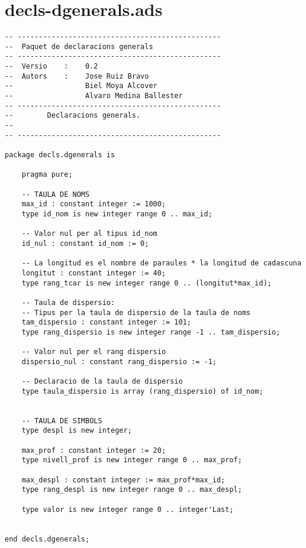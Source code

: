 \documentclass[10pt]{report}
\begin{document}
    \section{decls-dgenerals.ads}
    \begin{lstlisting}[style=Ada]
-- ------------------------------------------------
--  Paquet de declaracions generals
-- ------------------------------------------------
--  Versio    :    0.2
--  Autors    :    Jose Ruiz Bravo
--                 Biel Moya Alcover
--                 Alvaro Medina Ballester
-- ------------------------------------------------
--        Declaracions generals.
--
-- ------------------------------------------------

package decls.dgenerals is

    pragma pure;

    -- TAULA DE NOMS
    max_id : constant integer := 1000;
    type id_nom is new integer range 0 .. max_id;
    
    -- Valor nul per al tipus id_nom
    id_nul : constant id_nom := 0;
        
    -- La longitud es el nombre de paraules * la longitud de cadascuna
    longitut : constant integer := 40;
    type rang_tcar is new integer range 0 .. (longitut*max_id);
    
    -- Taula de dispersio:
    -- Tipus per la taula de dispersio de la taula de noms
    tam_dispersio : constant integer := 101;
    type rang_dispersio is new integer range -1 .. tam_dispersio;
    
    -- Valor nul per el rang dispersio
    dispersio_nul : constant rang_dispersio := -1;
    
    -- Declaracio de la taula de dispersio
    type taula_dispersio is array (rang_dispersio) of id_nom;
    
    
    -- TAULA DE SIMBOLS
    type despl is new integer;
    
    max_prof : constant integer := 20;
    type nivell_prof is new integer range 0 .. max_prof;
    
    max_despl : constant integer := max_prof*max_id;
    type rang_despl is new integer range 0 .. max_despl;
    
    type valor is new integer range 0 .. integer'Last;
    

end decls.dgenerals;
    \end{lstlisting}
    \newpage
        
\end{document}
